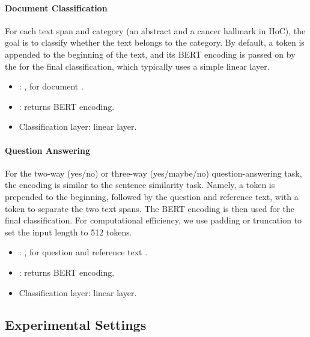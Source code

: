 \documentclass[acmlarge,screen,nonacm]{acmart}
\begin{document}
\paragraph{Document Classification} For each text span and category (an abstract and a cancer hallmark in HoC), the goal is to classify whether the text belongs to the  category. By default, a  token is appended to the beginning of the text, and its BERT encoding is passed on by the  for the final classification, which typically uses a simple linear layer.
\begin{itemize}
    \item :   , for document .
    \item : returns  BERT encoding.
    \item Classification layer: linear layer.
\end{itemize}



\paragraph{Question Answering} For the two-way (yes/no) or three-way (yes/maybe/no) question-answering task, the encoding is similar to the sentence similarity task. Namely, a  token is prepended to the beginning, followed by the question and reference text, with a  token to separate the two text spans. The  BERT encoding is then used for the final classification. For computational efficiency, we use padding or truncation to set the input length to 512 tokens.
\begin{itemize}
    \item :     , for question  and reference text .
    \item : returns  BERT encoding. 
    \item Classification layer: linear layer.
\end{itemize}

\subsection{Experimental Settings}
\end{document}
